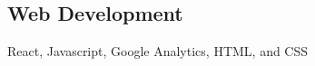 \documentclass[../techskills.tex]{subfiles}
\begin{document}
	\subsection{Web Development}
	React, Javascript, Google Analytics, HTML, and CSS
	\vspace*{-2mm}
\end{document}
